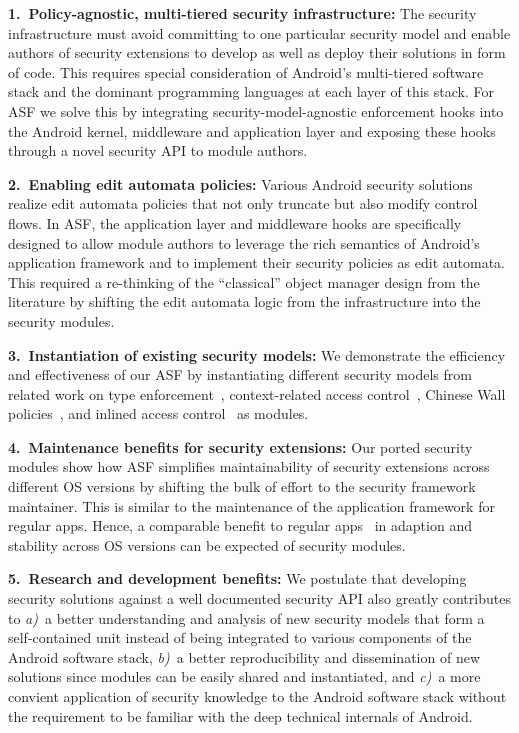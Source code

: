 \documentclass[letterpaper,twocolumn,10pt]{article}
\newcommand{\OURSHORT}{\textsc{ASF}\xspace}
\begin{document}
\textbf{1.~Policy-agnostic, multi-tiered security infrastructure:} The security infrastructure must avoid committing to one particular security model and enable authors of security extensions to develop as well as deploy their solutions in form of code. This requires special consideration of Android's multi-tiered software stack and the dominant programming languages at each layer of this stack. For \OURSHORT we solve this by integrating security-model-agnostic enforcement hooks into the Android kernel, middleware and application layer and exposing these hooks through a novel security API to module authors.

\textbf{2.~Enabling edit automata policies:} Various Android security solutions realize edit automata policies that not only truncate but also modify control flows.
In \OURSHORT, the application layer and middleware hooks are specifically designed to allow module authors to leverage the rich semantics of Android's application framework and to implement their security policies as edit automata. This required a re-thinking of the ``classical'' object manager design from the literature by shifting the edit automata logic from the infrastructure into the security modules.

\textbf{3.~Instantiation of existing security models:} We demonstrate the efficiency and effectiveness of our \OURSHORT by instantiating different security models from related work on type enforcement~\cite{TUD-CS-2013-0115,Smalley2013}, context-related access control~\cite{CoNgCr_10:CRePE}, Chinese Wall policies~\cite{BuDaDm_12:TowardsT}, and inlined access control~\cite{backes13TACAS} as modules.

\textbf{4.~Maintenance benefits for security extensions:} Our ported security modules show how \OURSHORT simplifies maintainability of security extensions across different OS versions by shifting the bulk of effort to the security framework maintainer. This is similar to the maintenance of the application framework for regular apps. Hence, a comparable benefit to regular apps~\cite{jisc} in adaption and stability across OS versions can be expected of security modules.

\textbf{5.~Research and development benefits:} We postulate that developing security solutions against a well documented security API also greatly contributes to \textit{a)}~a better understanding and analysis of new security models that form a self-contained unit instead of being integrated to various components of the Android software stack, \textit{b)}~a better reproducibility and dissemination of new solutions since modules can be easily shared and instantiated, and \textit{c)}~a more convient application of security knowledge to the Android software stack without the requirement to be familiar with the deep technical internals of Android.
\end{document}

